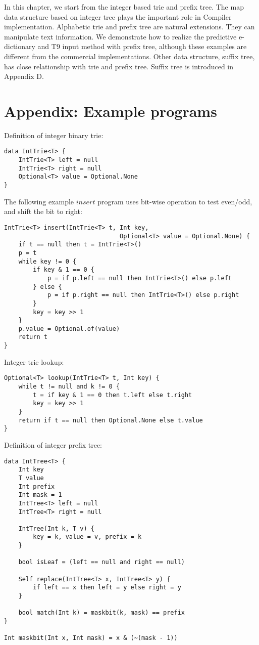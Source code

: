 \documentclass[b5paper]{article}
\begin{document}
In this chapter, we start from the integer based trie and prefix tree. The
map data structure based on integer tree plays the important role
in Compiler implementation. Alphabetic trie and prefix tree are
natural extensions. They can manipulate text information.
We demonstrate how to realize the predictive e-dictionary
and T9 input method with prefix tree, although these examples
are different from the commercial implementations.
Other data structure, suffix tree, has close
relationship with trie and prefix tree. Suffix tree is introduced
in Appendix D.

\section{Appendix: Example programs}

Definition of integer binary trie:

\begin{lstlisting}[language = Bourbaki]
data IntTrie<T> {
    IntTrie<T> left = null
    IntTrie<T> right = null
    Optional<T> value = Optional.None
}
\end{lstlisting}

The following example $insert$ program uses bit-wise operation to test even/odd, and shift the bit to right:

\begin{lstlisting}[language = Bourbaki]
IntTrie<T> insert(IntTrie<T> t, Int key,
                                Optional<T> value = Optional.None) {
    if t == null then t = IntTrie<T>()
    p = t
    while key != 0 {
        if key & 1 == 0 {
            p = if p.left == null then IntTrie<T>() else p.left
        } else {
            p = if p.right == null then IntTrie<T>() else p.right
        }
        key = key >> 1
    }
    p.value = Optional.of(value)
    return t
}
\end{lstlisting}

Integer trie lookup:

\begin{lstlisting}[language = Bourbaki]
Optional<T> lookup(IntTrie<T> t, Int key) {
    while t != null and k != 0 {
        t = if key & 1 == 0 then t.left else t.right
        key = key >> 1
    }
    return if t == null then Optional.None else t.value
}
\end{lstlisting}

Definition of integer prefix tree:

\begin{lstlisting}[language = Bourbaki]
data IntTree<T> {
    Int key
    T value
    Int prefix
    Int mask = 1
    IntTree<T> left = null
    IntTree<T> right = null

    IntTree(Int k, T v) {
        key = k, value = v, prefix = k
    }

    bool isLeaf = (left == null and right == null)

    Self replace(IntTree<T> x, IntTree<T> y) {
        if left == x then left = y else right = y
    }

    bool match(Int k) = maskbit(k, mask) == prefix
}

Int maskbit(Int x, Int mask) = x & (~(mask - 1))
\end{lstlisting}
\end{document}
